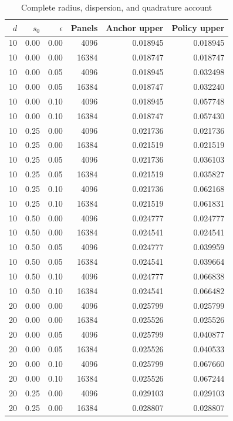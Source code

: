 \begin{longtable}{rrrrrr}
\caption{Complete radius, dispersion, and quadrature account}\label{tab:r10allbounds}\\
\toprule
$d$ & $s_0$ & $\epsilon$ & Panels & Anchor upper & Policy upper\\
\midrule\endhead
10 & 0.00 & 0.00 & 4096 & 0.018945 & 0.018945\\
10 & 0.00 & 0.00 & 16384 & 0.018747 & 0.018747\\
10 & 0.00 & 0.05 & 4096 & 0.018945 & 0.032498\\
10 & 0.00 & 0.05 & 16384 & 0.018747 & 0.032240\\
10 & 0.00 & 0.10 & 4096 & 0.018945 & 0.057748\\
10 & 0.00 & 0.10 & 16384 & 0.018747 & 0.057430\\
10 & 0.25 & 0.00 & 4096 & 0.021736 & 0.021736\\
10 & 0.25 & 0.00 & 16384 & 0.021519 & 0.021519\\
10 & 0.25 & 0.05 & 4096 & 0.021736 & 0.036103\\
10 & 0.25 & 0.05 & 16384 & 0.021519 & 0.035827\\
10 & 0.25 & 0.10 & 4096 & 0.021736 & 0.062168\\
10 & 0.25 & 0.10 & 16384 & 0.021519 & 0.061831\\
10 & 0.50 & 0.00 & 4096 & 0.024777 & 0.024777\\
10 & 0.50 & 0.00 & 16384 & 0.024541 & 0.024541\\
10 & 0.50 & 0.05 & 4096 & 0.024777 & 0.039959\\
10 & 0.50 & 0.05 & 16384 & 0.024541 & 0.039664\\
10 & 0.50 & 0.10 & 4096 & 0.024777 & 0.066838\\
10 & 0.50 & 0.10 & 16384 & 0.024541 & 0.066482\\
20 & 0.00 & 0.00 & 4096 & 0.025799 & 0.025799\\
20 & 0.00 & 0.00 & 16384 & 0.025526 & 0.025526\\
20 & 0.00 & 0.05 & 4096 & 0.025799 & 0.040877\\
20 & 0.00 & 0.05 & 16384 & 0.025526 & 0.040533\\
20 & 0.00 & 0.10 & 4096 & 0.025799 & 0.067660\\
20 & 0.00 & 0.10 & 16384 & 0.025526 & 0.067244\\
20 & 0.25 & 0.00 & 4096 & 0.029103 & 0.029103\\
20 & 0.25 & 0.00 & 16384 & 0.028807 & 0.028807\\

\end{longtable}
